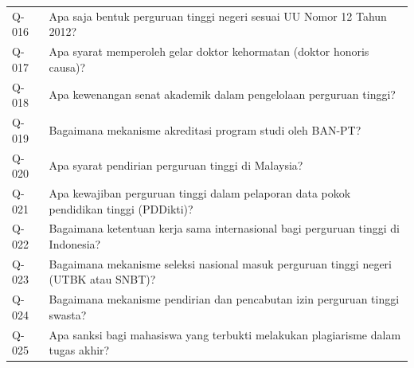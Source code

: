 \begin{longtable}{@{}>{\RaggedRight\arraybackslash}p{1.6cm}>{\RaggedRight\arraybackslash}p{\dimexpr\textwidth-1.6cm-2\tabcolsep\relax}@{}}
Q-016 & Apa saja bentuk perguruan tinggi negeri sesuai UU Nomor 12 Tahun 2012? \\
Q-017 & Apa syarat memperoleh gelar doktor kehormatan (doktor honoris causa)? \\
Q-018 & Apa kewenangan senat akademik dalam pengelolaan perguruan tinggi? \\
Q-019 & Bagaimana mekanisme akreditasi program studi oleh BAN-PT? \\
Q-020 & Apa syarat pendirian perguruan tinggi di Malaysia? \\
Q-021 & Apa kewajiban perguruan tinggi dalam pelaporan data pokok pendidikan tinggi (PDDikti)? \\
Q-022 & Bagaimana ketentuan kerja sama internasional bagi perguruan tinggi di Indonesia? \\
Q-023 & Bagaimana mekanisme seleksi nasional masuk perguruan tinggi negeri (UTBK atau SNBT)? \\
Q-024 & Bagaimana mekanisme pendirian dan pencabutan izin perguruan tinggi swasta? \\
Q-025 & Apa sanksi bagi mahasiswa yang terbukti melakukan plagiarisme dalam tugas akhir? \\
\end{longtable}
\endgroup

